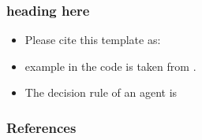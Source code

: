 \documentclass[11pt]{beamer}
\begin{document}
\begin{frame}
    \frametitle{heading here}
    \begin{itemize}
        \item<+-> Please cite this template as: \citet{GaudeckerEconProjectTemplates}
        \item<+-> \citet{Schelling69} example in the code is taken from \citet{StachurskiSargent13}.
        \item<+-> The decision rule of an agent is 
    \end{itemize}
    \note{~}
\end{frame}


 {
    \begin{frame}
        \frametitle{}
    \end{frame}

}

\begin{frame}[allowframebreaks]
    \frametitle{References}
    
    
    
    
\end{frame}
\end{document}
